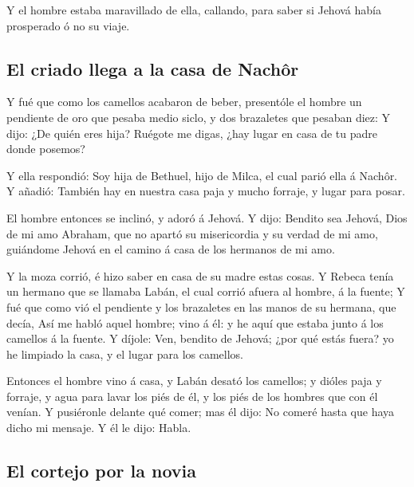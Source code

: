  Y el hombre estaba maravillado de ella, callando, para
saber si Jehová había prosperado ó no su viaje.

\hypertarget{el-criado-llega-a-la-casa-de-nachuxf4r}{%
\subsection{El criado llega a la casa de
Nachôr}\label{el-criado-llega-a-la-casa-de-nachuxf4r}}

 Y fué que como los camellos acabaron de beber, presentóle
el hombre un pendiente de oro que pesaba medio siclo, y dos brazaletes
que pesaban diez:  Y dijo: ¿De quién eres hija? Ruégote me
digas, ¿hay lugar en casa de tu padre donde posemos?

 Y ella respondió: Soy hija de Bethuel, hijo de Milca, el
cual parió ella á Nachôr.  Y añadió: También hay en nuestra
casa paja y mucho forraje, y lugar para posar.

 El hombre entonces se inclinó, y adoró á Jehová.
 Y dijo: Bendito sea Jehová, Dios de mi amo Abraham, que no
apartó su misericordia y su verdad de mi amo, guiándome Jehová en el
camino á casa de los hermanos de mi amo.

 Y la moza corrió, é hizo saber en casa de su madre estas
cosas.  Y Rebeca tenía un hermano que se llamaba Labán, el
cual corrió afuera al hombre, á la fuente;  Y fué que como
vió el pendiente y los brazaletes en las manos de su hermana, que decía,
Así me habló aquel hombre; vino á él: y he aquí que estaba junto á los
camellos á la fuente.  Y díjole: Ven, bendito de Jehová;
¿por qué estás fuera? yo he limpiado la casa, y el lugar para los
camellos.

 Entonces el hombre vino á casa, y Labán desató los
camellos; y dióles paja y forraje, y agua para lavar los piés de él, y
los piés de los hombres que con él venían.  Y pusiéronle
delante qué comer; mas él dijo: No comeré hasta que haya dicho mi
mensaje. Y él le dijo: Habla.

\hypertarget{el-cortejo-por-la-novia}{%
\subsection{El cortejo por la novia}\label{el-cortejo-por-la-novia}}

